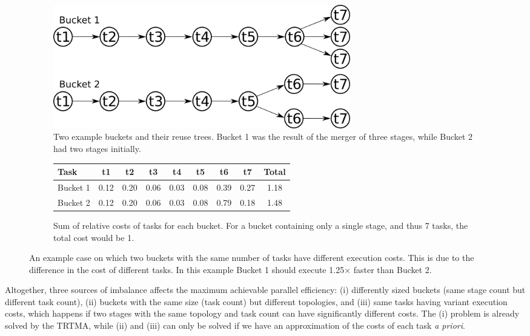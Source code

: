 \begin{figure}[t!]
   \centering
   \begin{subfigure}[t]{0.9\textwidth}
       \centering
       \includegraphics[width=0.7\textwidth]{img/unbal}
       \caption{Two example buckets and their reuse trees. Bucket 1 was the result of the merger of three stages, while Bucket 2 had two stages initially.}
       \label{fig:unbal}
   \end{subfigure}
   \par\bigskip
   \begin{subfigure}[t]{0.9\textwidth}
   	   \centering
	   \begin{tabular*}{400pt}{@{\extracolsep\fill}lcccccccc@{\extracolsep\fill}}
			\toprule
			Task 				&	t1	&	t2	&	t3	&	t4	&	t5	&	t6	&	t7	&	Total\\
			\midrule
			Bucket 1	&	0.12	&	0.20	&	0.06	&	0.03	&	0.08	&	0.39	&	0.27	&	1.18	\\
			Bucket 2	&	0.12	&	0.20	&	0.06	&	0.03	&	0.08	&	0.79	&	0.18	&	1.48	\\
			\bottomrule
	   \end{tabular*}
		\caption{Sum of relative costs of tasks for each bucket. For a bucket containing only a single stage, and thus 7 tasks, the total cost would be 1.}
		\label{fig:unbal-tab}
	\end{subfigure}
	   \caption{An example case on which two buckets with the same number of tasks have different execution costs. This is due to the difference in the cost of different tasks. In this example Bucket 1 should execute 1.25$\times$ faster than Bucket 2.}
   \label{fig:unbal-ex}
\end{figure}

Altogether, three sources of imbalance affects the maximum achievable parallel efficiency: (i) differently sized buckets (same stage count but different task count), (ii) buckets with the same size (task count) but different topologies, and (iii) same tasks having variant execution costs, which happens if two stages with the same topology and task count can have significantly different costs. The (i) problem is already solved by the TRTMA, while (ii) and (iii) can only be solved if we have an approximation of the costs of each task {\it a priori}.

